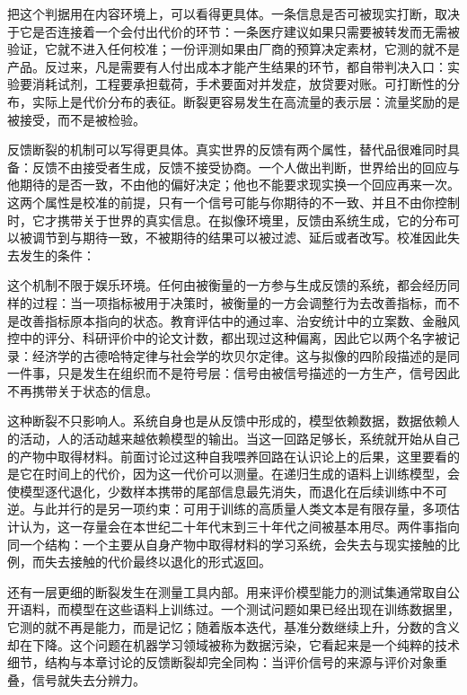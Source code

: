 把这个判据用在内容环境上，可以看得更具体。一条信息是否可被现实打断，取决于它是否连接着一个会付出代价的环节：一条医疗建议如果只需要被转发而无需被验证，它就不进入任何校准；一份评测如果由厂商的预算决定素材，它测的就不是产品。反过来，凡是需要有人付出成本才能产生结果的环节，都自带判决入口：实验要消耗试剂，工程要承担载荷，手术要面对并发症，放贷要对账。可打断性的分布，实际上是代价分布的表征。断裂更容易发生在高流量的表示层：流量奖励的是被接受，而不是被检验。

反馈断裂的机制可以写得更具体。真实世界的反馈有两个属性，替代品很难同时具备：反馈不由接受者生成，反馈不接受协商。一个人做出判断，世界给出的回应与他期待的是否一致，不由他的偏好决定；他也不能要求现实换一个回应再来一次。这两个属性是校准的前提，只有一个信号可能与你期待的不一致、并且不由你控制时，它才携带关于世界的真实信息。在拟像环境里，反馈由系统生成，它的分布可以被调节到与期待一致，不被期待的结果可以被过滤、延后或者改写。校准因此失去发生的条件：

这个机制不限于娱乐环境。任何由被衡量的一方参与生成反馈的系统，都会经历同样的过程：当一项指标被用于决策时，被衡量的一方会调整行为去改善指标，而不是改善指标原本指向的状态。教育评估中的通过率、治安统计中的立案数、金融风控中的评分、科研评价中的论文计数，都出现过这种偏离，因此它以两个名字被记录：经济学的古德哈特定律与社会学的坎贝尔定律\cite{goodhart1975problems}\cite{campbell1979assessing}。这与拟像的四阶段描述的是同一件事，只是发生在组织而不是符号层：信号由被信号描述的一方生产，信号因此不再携带关于状态的信息。

这种断裂不只影响人。系统自身也是从反馈中形成的，模型依赖数据，数据依赖人的活动，人的活动越来越依赖模型的输出。当这一回路足够长，系统就开始从自己的产物中取得材料。前面讨论过这种自我喂养回路在认识论上的后果，这里要看的是它在时间上的代价，因为这一代价可以测量。在递归生成的语料上训练模型，会使模型逐代退化，少数样本携带的尾部信息最先消失，而退化在后续训练中不可逆\cite{shumailov2024ai}。与此并行的是另一项约束：可用于训练的高质量人类文本是有限存量，多项估计认为，这一存量会在本世纪二十年代末到三十年代之间被基本用尽\cite{villalobos2022will}。两件事指向同一个结构：一个主要从自身产物中取得材料的学习系统，会失去与现实接触的比例，而失去接触的代价最终以退化的形式返回。

还有一层更细的断裂发生在测量工具内部。用来评价模型能力的测试集通常取自公开语料，而模型在这些语料上训练过。一个测试问题如果已经出现在训练数据里，它测的就不再是能力，而是记忆；随着版本迭代，基准分数继续上升，分数的含义却在下降。这个问题在机器学习领域被称为数据污染，它看起来是一个纯粹的技术细节，结构与本章讨论的反馈断裂却完全同构：当评价信号的来源与评价对象重叠，信号就失去分辨力\cite{sainz2023nlp}。

